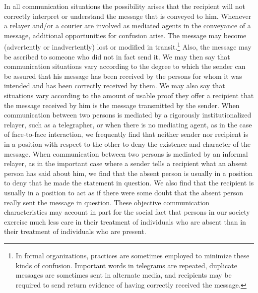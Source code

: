 \documentclass[openany,nobib]{tufte-book}
\begin{document}
\newpage In all communication situations the possibility arises that the
recipient will not correctly interpret or understand the message that is
conveyed to him. Whenever a relayer and/or a courier are involved as
mediated agents in the conveyance of a message, additional opportunities
for confusion arise. The message may become (advertently or
inadvertently) lost or modified in transit.\footnote{In formal
  organizations, practices are sometimes employed to minimize these
  kinds of confusion. Important words in telegrams are repeated,
  duplicate messages are sometimes sent in alternate media, and
  recipients may be required to send return evidence of having correctly
  received the message.} Also, the message may be ascribed to someone
who did not in fact send it. We may then say that communication
situations vary according to the degree to which the sender can be
assured that his message has been received by the persons for whom it
was intended and has been correctly received by them. We may also say
that situations vary according to the amount of usable proof they offer
a recipient that the message received by him is the message transmitted
by the sender. When communication between two persons is mediated by a
rigorously institutionalized relayer, such as a telegrapher, or when
there is no mediating agent, as in the case of face-to-face interaction,
we frequently find that neither sender nor recipient is in a position
with respect to the other to deny the existence and character of the
message. When communication between two persons is mediated by an
informal relayer, as in the important case where a sender tells a
recipient what an absent person has said about him, we find that the
absent person is usually in a position to deny that he made the
statement in question. We also find that the recipient is usually in a
position to act as if there were some doubt that the absent person
really sent the message in question. These objective communication
characteristics may account in part for the social fact that persons in
our society exercise much less care in their treatment of individuals
who are absent than in their treatment of individuals who are present.
\end{document}
